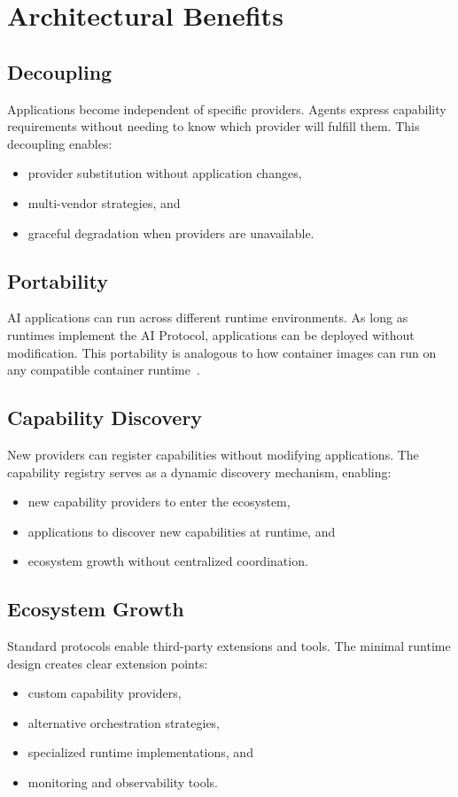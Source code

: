 \section{Architectural Benefits}

\subsection{Decoupling}

Applications become independent of specific providers. Agents express capability requirements without needing to know which provider will fulfill them. This decoupling enables:
\begin{itemize}[leftmargin=*,nosep]
  \item provider substitution without application changes,
  \item multi-vendor strategies, and
  \item graceful degradation when providers are unavailable.
\end{itemize}

\subsection{Portability}

AI applications can run across different runtime environments. As long as runtimes implement the AI Protocol, applications can be deployed without modification. This portability is analogous to how container images can run on any compatible container runtime~\cite{kubernetes_arch,burns_borg_kubernetes}.

\subsection{Capability Discovery}

New providers can register capabilities without modifying applications. The capability registry serves as a dynamic discovery mechanism, enabling:
\begin{itemize}[leftmargin=*,nosep]
  \item new capability providers to enter the ecosystem,
  \item applications to discover new capabilities at runtime, and
  \item ecosystem growth without centralized coordination.
\end{itemize}

\subsection{Ecosystem Growth}

Standard protocols enable third-party extensions and tools. The minimal runtime design creates clear extension points:
\begin{itemize}[leftmargin=*,nosep]
  \item custom capability providers,
  \item alternative orchestration strategies,
  \item specialized runtime implementations, and
  \item monitoring and observability tools.
\end{itemize}

